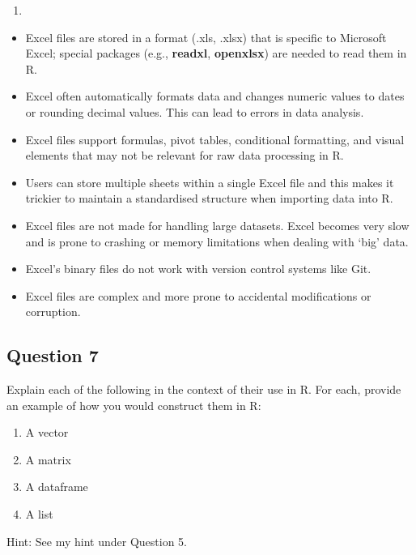 \documentclass[
  10t,
]{article}
\providecommand{\tightlist}{%
  \setlength{\itemsep}{0pt}\setlength{\parskip}{0pt}}
\begin{document}
\begin{enumerate}
\def\labelenumi{\alph{enumi})}
\setcounter{enumi}{2}
\tightlist
\item
\end{enumerate}

\begin{itemize}
\tightlist
\item
  Excel files are stored in a format (.xls, .xlsx) that is specific to
  Microsoft Excel; special packages (e.g., \textbf{readxl},
  \textbf{openxlsx}) are needed to read them in R.
\item
  Excel often automatically formats data and changes numeric values to
  dates or rounding decimal values. This can lead to errors in data
  analysis.
\item
  Excel files support formulas, pivot tables, conditional formatting,
  and visual elements that may not be relevant for raw data processing
  in R.
\item
  Users can store multiple sheets within a single Excel file and this
  makes it trickier to maintain a standardised structure when importing
  data into R.
\item
  Excel files are not made for handling large datasets. Excel becomes
  very slow and is prone to crashing or memory limitations when dealing
  with `big' data.
\item
  Excel's binary files do not work with version control systems like
  Git.
\item
  Excel files are complex and more prone to accidental modifications or
  corruption.
\end{itemize}

\subsection{Question 7}\label{question-7}

Explain each of the following in the context of their use in R. For
each, provide an example of how you would construct them in R:

\begin{enumerate}
\def\labelenumi{\alph{enumi}.}
\tightlist
\item
  A vector
\item
  A matrix
\item
  A dataframe
\item
  A list
\end{enumerate}

Hint: See my hint under Question 5.
\end{document}
